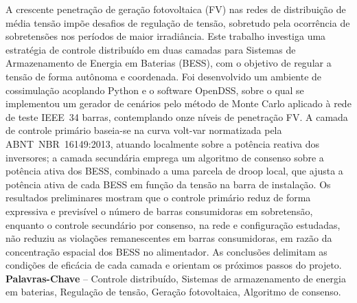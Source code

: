 \documentclass[pnumromarab,normalnum,abnttoc,times]{politex}
\begin{document}
\capa
\falsafolhaderosto
\folhaderosto

\begin{resumo}
A crescente penetração de geração fotovoltaica (FV) nas redes de distribuição 
de média tensão impõe desafios de regulação de tensão, sobretudo pela 
ocorrência de sobretensões nos períodos de maior irradiância. Este trabalho 
investiga uma estratégia de controle distribuído em duas camadas para 
Sistemas de Armazenamento de Energia em Baterias (BESS), com o objetivo de 
regular a tensão de forma autônoma e coordenada. Foi desenvolvido um ambiente 
de cossimulação acoplando Python e o software OpenDSS, sobre o qual se 
implementou um gerador de cenários pelo método de Monte Carlo aplicado à 
rede de teste IEEE~34 barras, contemplando onze níveis de penetração FV. A 
camada de controle primário baseia-se na curva volt-var normatizada pela 
ABNT~NBR~16149:2013, atuando localmente sobre a potência reativa dos 
inversores; a camada secundária emprega um algoritmo de consenso sobre a
potência ativa dos BESS, combinado a uma parcela de droop local, que ajusta a
potência ativa de cada BESS em função da tensão na barra de instalação. 
Os resultados preliminares 
mostram que o controle primário reduz de forma expressiva e previsível o
número de barras consumidoras em sobretensão, enquanto o controle secundário 
por consenso, na rede e configuração estudadas, não reduziu as violações 
remanescentes em barras consumidoras, em 
razão da concentração espacial dos BESS no alimentador. As conclusões 
delimitam as condições de eficácia de cada camada e orientam os próximos 
passos do projeto.
%
\\[3\baselineskip]
%
\textbf{Palavras-Chave} -- Controle distribuído, Sistemas de armazenamento de energia em baterias, Regulação de tensão, Geração fotovoltaica, Algoritmo de consenso.
\end{resumo}
\end{document}
